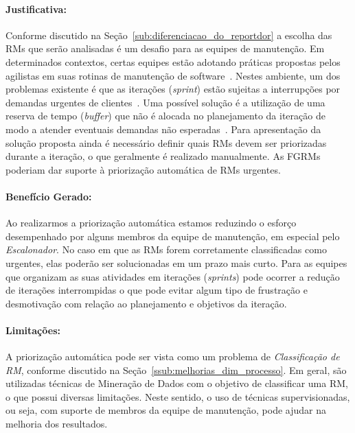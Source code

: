 \paragraph{Justificativa:}\label{par:justificativa_s07}

Conforme discutido na Seção~\ref{sub:diferenciacao_do_reportdor} a escolha das
RMs que serão analisadas é um desafio para as equipes de manutenção. Em
determinados contextos, certas equipes estão adotando práticas propostas pelos
agilistas em suas rotinas de manutenção de
software~\cite{svensson2005introducing}. Nestes ambiente, um dos problemas
existente é que as iterações (\textit{sprint}) estão sujeitas a interrupções
por demandas urgentes de clientes~\cite{bennett2000software}. Uma possível
solução é a utilização de uma reserva de tempo (\textit{buffer}) que não é
alocada no planejamento da iteração de modo a atender eventuais demandas não
esperadas~\cite{schwaber2002agile}. Para apresentação da solução proposta ainda
é necessário definir quais RMs devem ser priorizadas durante a iteração, o que
geralmente é realizado manualmente. As FGRMs poderiam dar suporte à priorização
automática de RMs urgentes.

\paragraph{Benefício Gerado:}\label{par:papéis_afetados_s07}

Ao realizarmos a priorização automática estamos reduzindo o esforço
desempenhado por alguns membros da equipe de manutenção, em especial pelo
\textit{Escalonador}. No caso em que as RMs forem corretamente classificadas
como urgentes, elas poderão ser solucionadas em um prazo mais curto. Para as
equipes que organizam as suas atividades em iterações (\textit{sprints}) pode
ocorrer a redução de iterações interrompidas o que pode evitar algum tipo de
frustração e desmotivação com relação ao planejamento e objetivos da iteração.

\paragraph{Limitações:}\label{par:limitacoes_s07}

A priorização automática pode ser vista como um problema de
\textit{Classificação de RM}, conforme discutido na
Seção~\ref{ssub:melhorias_dim_processo}. Em geral, são utilizadas técnicas de
Mineração de Dados com o objetivo de classificar uma RM, o que possui diversas
limitações. Neste sentido, o uso de técnicas supervisionadas, ou seja, com
suporte de membros da equipe de manutenção, pode ajudar na melhoria dos
resultados.

